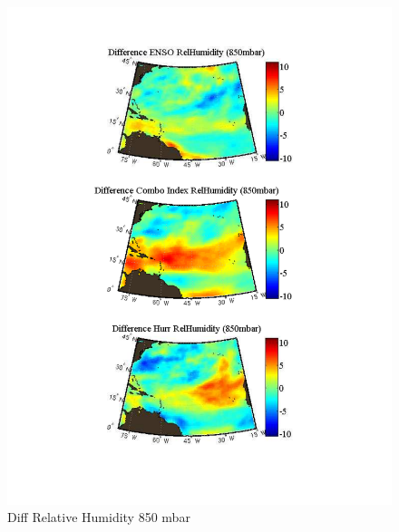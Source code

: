 \documentclass[]{article}
\begin{document}
\begin{figure}[ht]
\begin{minipage}[b]{0.55\linewidth}
\includegraphics[width=\textwidth]{figures/comboIndex/composites/compareMDRCompositesRelativeHumidity.pdf}
\caption{Diff Relative Humidity 850 mbar}
\label{fig:figure34}
\end{minipage}
\hspace{0cm}
\begin{minipage}[b]{0.55\linewidth}

\end{minipage}
\end{figure}
\end{document}
